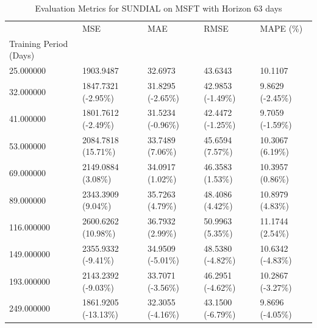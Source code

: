 \begin{table}
\caption{Evaluation Metrics for SUNDIAL on MSFT with Horizon 63 days}
\label{tab:sundial_MSFT_h63_metrics}
\begin{tabular}{lllll}
\toprule
 & MSE & MAE & RMSE & MAPE (\%) \\
Training Period (Days) &  &  &  &  \\
\midrule
25.000000 & 1903.9487 & 32.6973 & 43.6343 & 10.1107 \\
32.000000 & 1847.7321 (-2.95\%) & 31.8295 (-2.65\%) & 42.9853 (-1.49\%) & 9.8629 (-2.45\%) \\
41.000000 & 1801.7612 (-2.49\%) & 31.5234 (-0.96\%) & 42.4472 (-1.25\%) & 9.7059 (-1.59\%) \\
53.000000 & 2084.7818 (15.71\%) & 33.7489 (7.06\%) & 45.6594 (7.57\%) & 10.3067 (6.19\%) \\
69.000000 & 2149.0884 (3.08\%) & 34.0917 (1.02\%) & 46.3583 (1.53\%) & 10.3957 (0.86\%) \\
89.000000 & 2343.3909 (9.04\%) & 35.7263 (4.79\%) & 48.4086 (4.42\%) & 10.8979 (4.83\%) \\
116.000000 & 2600.6262 (10.98\%) & 36.7932 (2.99\%) & 50.9963 (5.35\%) & 11.1744 (2.54\%) \\
149.000000 & 2355.9332 (-9.41\%) & 34.9509 (-5.01\%) & 48.5380 (-4.82\%) & 10.6342 (-4.83\%) \\
193.000000 & 2143.2392 (-9.03\%) & 33.7071 (-3.56\%) & 46.2951 (-4.62\%) & 10.2867 (-3.27\%) \\
249.000000 & 1861.9205 (-13.13\%) & 32.3055 (-4.16\%) & 43.1500 (-6.79\%) & 9.8696 (-4.05\%) \\
\bottomrule
\end{tabular}
\end{table}
